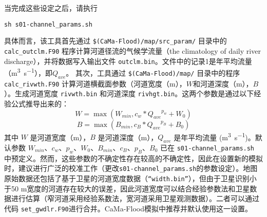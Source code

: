 \begin{enumerate}
当完成这些设定之后，请执行
\begin{lstlisting}
sh s01-channel_params.sh
\end{lstlisting}
具体而言，该工具首先通过 \texttt{\$(CaMa-Flood)/map/src\_param/} 目录中的 \texttt{calc\allowbreak\_outclm\allowbreak.F90} 程序计算河道径流的气候学流量（the climatology of daily river discharge），并将数据写入输出文件 \texttt{outclm.bin}。文件中的记录1是年平均流量（\unit{m^3.s^{-1}}），即$Q_{ave}$。 其次，工具通过 \texttt{\$(CaMa-Flood)/map/} 目录中的程序 \texttt{calc\_rivwth.F90} 计算河道横截面参数（河道宽度（m），$W$和河道深度（m），$B$）。生成河道宽度 \texttt{rivwth.bin} 和河道深度 \texttt{rivhgt.bin}。这两个参数是通过以下经验公式推导出来的：
\begin{equation}
W=\max(W_{min},c_w\ast{Q_{ave}}^{p_w}+W_0)
\end{equation}
\begin{equation}
B=\max(B_{min},c_B\ast{Q_{ave}}^{p_B}+B_0)
\end{equation}
其中 $W$ 是河道宽度（m），$B$ 是河道深度（m），$Q_{ave}$ 是年平均流量 (\unit{m^3.s^{-1}})。默认参数 $W_{min}$、$c_w$、$p_w$、$W_0$、$B_{min}$、$c_B$、$p_B$、$B_0$ 已在 \texttt{s01-channel\_params.sh} 中预定义。然而，这些参数的不确定性存在较高的不确定性，因此在设置新的模拟时，建议进行广泛的校准工作（更改\texttt{s01-channel\_params.sh}的参数设定）。地图原始数据还包括了基于卫星的河道宽度数据（\texttt{“width.bin”}），但由于卫星识别小于50 m宽度的河道存在较大的误差，因此河道宽度可以结合经验参数法和卫星数据进行估算（窄河道采用经验系数法，宽河道采用卫星观测数据）。二者可以通过代码 \texttt{set\_gwdlr.F90}进行合并。CaMa-Flood模拟中推荐并默认使用这一设置。


\end{enumerate}

\clearpage
